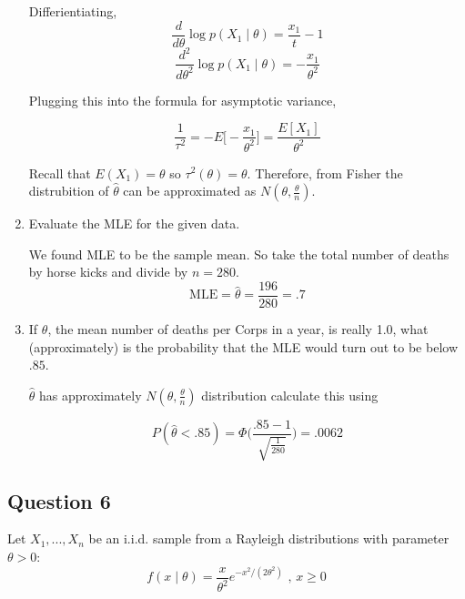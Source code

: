 \documentclass{tufte-book}
\newcommand{\MLE}{\mathrm{MLE}}
\theoremstyle{mytheoremstyle}
\theoremstyle{mylemstyle}
\theoremstyle{mydefstyle}
\begin{document}
\begin{enumerate}
Differientiating,
\[ \frac{d}{d\theta}\log p(X_1 \mid \theta) = \frac{x_1}{t}-1 \]
\[ \frac{d^2}{d\theta^2}\log p(X_1 \mid \theta) = -\frac{x_1}{\theta^2} \]

Plugging this into the formula for asymptotic variance,

\[ \frac{1}{\tau^2} = -E\Big[-\frac{x_1}{\theta^2}\Big] = \frac{E[X_1]}{\theta^2} \]

Recall that $E(X_1) = \theta$ so $\tau^2(\theta) = \theta$.  Therefore, from Fisher the distrubition of $\hat{\theta}$ can be approximated as $N(\theta, \frac{\theta}{n})$.

\item Evaluate the MLE for the given data.

We found MLE to be the sample mean.  So take the total number of deaths by horse kicks and divide by $n=280$.
\[ \MLE = \hat{\theta} = \frac{196}{280}= .7 \]

\item If $\theta$, the mean number of deaths per Corps in a year, is really 1.0, what (approximately) is the probability that the MLE would turn out to be below $.85$.

 $\hat{\theta}$ has approximately $N(\theta, \frac{\theta}{n})$ distribution calculate this using

\[P(\hat{\theta} < .85) = \Phi\Big(\frac{.85-1}{\sqrt{\frac{1}{280}}}\Big) = .0062\]
\end{enumerate}

\subsection{Question 6}
Let $X_1,...,X_n$ be an i.i.d. sample from a Rayleigh distributions with parameter $\theta>0$:
\[ f(x\mid \theta) = \frac{x}{\theta^2}e^{-x^2/(2\theta^2)} \text{ , } x \geq 0 \]
\end{document}
